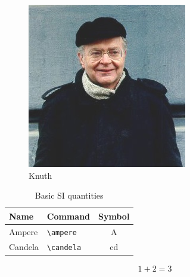 \begin{figure}
	\centering
	\includegraphics[width=0.4\linewidth]{images/knuth}
	\caption{Knuth}
	\label{fig:my_label}
\end{figure}

\begin{table}
	\centering
	\caption{Basic SI quantities}%
	\begin{tabular}{llc}
		\toprule
		Name 	& 	Command 	& 	Symbol         \\
		\midrule
		Ampere     & \verb|\ampere| & \si{\ampere}   \\
		Candela   & \verb|\candela| & \si{\candela}  \\
		\bottomrule
	\end{tabular}
\end{table}

\begin{align} %
	1+2=3
\end{align}